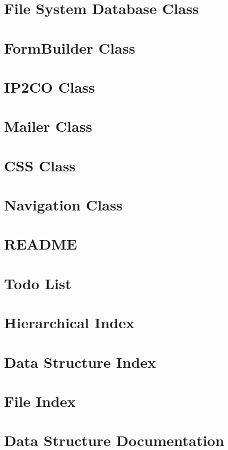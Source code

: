 \documentclass{book}
\begin{document}
\chapter{File System Database Class}
\label{fsdb}
\hypertarget{fsdb}{}

\chapter{Form\-Builder Class}
\label{fb1}
\hypertarget{fb1}{}

\chapter{I\-P2\-C\-O Class}
\label{ip2country}
\hypertarget{ip2country}{}

\chapter{Mailer Class}
\label{mailer1}
\hypertarget{mailer1}{}

\chapter{C\-S\-S Class}
\label{css1}
\hypertarget{css1}{}

\chapter{Navigation Class}
\label{nav1}
\hypertarget{nav1}{}

\chapter{R\-E\-A\-D\-M\-E}
\label{md_README}
\hypertarget{md_README}{}

\chapter{Todo List}
\label{todo}
\hypertarget{todo}{}

\chapter{Hierarchical Index}

\chapter{Data Structure Index}

\chapter{File Index}

\chapter{Data Structure Documentation}

























\end{document}
